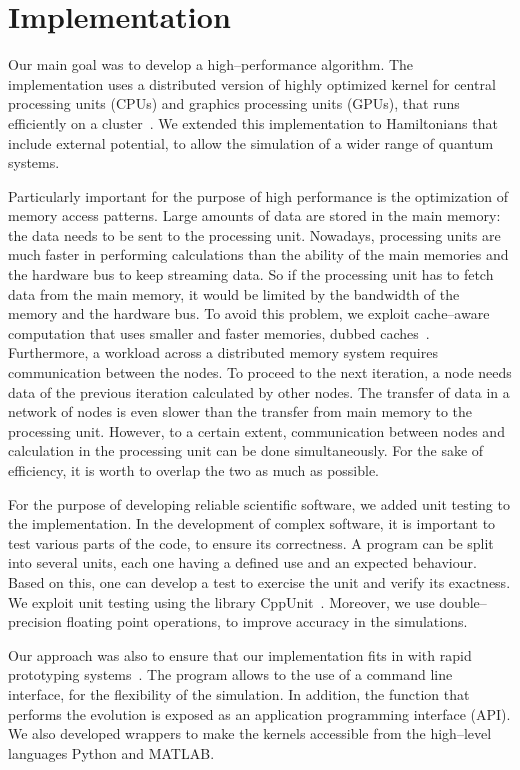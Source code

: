\chapter{Implementation}
Our main goal was to develop a high--performance algorithm. The implementation uses a distributed version of highly optimized kernel for central processing units (CPUs) and graphics processing units (GPUs), that runs efficiently on a cluster~\citep{Wittek20131165}. We extended this implementation to Hamiltonians that include external potential, to allow the simulation of a wider range of quantum systems. 

Particularly important for the purpose of high performance is the optimization of memory access patterns. Large amounts of data are stored in the main memory: the data needs to be sent to the processing unit. Nowadays, processing units are much faster in performing calculations than the ability of the main memories and the hardware bus to keep streaming data. So if the processing unit has to fetch data from the main memory, it would be limited by the bandwidth of the memory and the hardware bus. To avoid this problem, we exploit cache--aware computation that uses smaller and faster memories, dubbed caches~\citep{Handy}. 
Furthermore, a workload across a distributed memory system requires  communication between the nodes. To proceed to the next iteration, a node needs data of the previous iteration calculated by other nodes. The transfer of data in a network of nodes is even slower than the transfer from main memory to the processing unit. However, to a certain extent, communication between nodes and calculation in the processing unit can be done simultaneously. For the sake of efficiency, it is worth to overlap the two as much as possible.

For the purpose of developing reliable scientific software, we added unit testing to the implementation. In the development of complex software, it is important to test various parts of the code, to ensure its correctness. A program can be split into several units, each one having a defined use and an expected behaviour. Based on this, one can develop a test to exercise the unit and verify its exactness. We exploit unit testing using the library CppUnit~\citep{CPPUnit}. Moreover, we use double--precision floating point operations, to improve accuracy in the simulations.

Our approach was also to ensure that our implementation fits in with rapid prototyping
systems~\citep{SmithMF}. The program allows to the use of a command line interface, for the flexibility of the simulation. In addition, the function that performs the evolution is exposed as an application programming interface (API). We also developed wrappers to make the kernels accessible from the  high--level languages Python and MATLAB.

